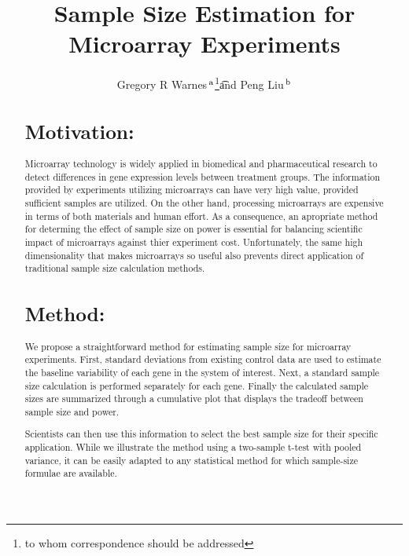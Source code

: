 \documentclass{bioinfo}
\begin{document}

\title{Sample Size Estimation for Microarray Experiments}
\author{
  Gregory R Warnes\,$^{\rm a}$\footnote{to whom correspondence should
    be addressed}\t
  and
  Peng Liu\,$^{\rm b}$
}
\address{
  $^{\rm a}$Nonclinical Statistics, Pfizer Global Research and Development,
  Groton, CT 06340 \\
  $^{\rm b}$Department of Biological Statistics and Computational
  Biology, Cornell University, Ithaca, NY 14853
  }

\maketitle

\begin{abstract}

\section{Motivation:}

Microarray technology is widely applied in biomedical and
pharmaceutical research to detect differences in gene expression
levels between treatment groups.  The information provided by
experiments utilizing microarrays can have very high value, provided
sufficient samples are utilized.  On the other hand, processing
microarrays are expensive in terms of both materials and human
effort.  As a consequence, an apropriate method for determing the
effect of sample size on power is essential for balancing scientific
impact of microarrays against thier experiment cost.  Unfortunately,
the same high dimensionality that makes microarrays so useful also
prevents direct application of traditional sample size calculation
methods.

\section{Method:}

We propose a straightforward method for estimating sample size for
microarray experiments. First, standard deviations from existing
control data are used to estimate the baseline variability of each
gene in the system of interest. Next, a standard sample size
calculation is performed separately for each gene.  Finally the
calculated sample sizes are summarized through a cumulative plot
that displays the tradeoff between sample size and power.

Scientists can then use this information to select the best sample
size for their specific application.  While we illustrate the method
using a two-sample t-test with pooled variance, it can be easily
adapted to any statistical method for which sample-size formulae are
available.


\end{abstract}
\end{document}
